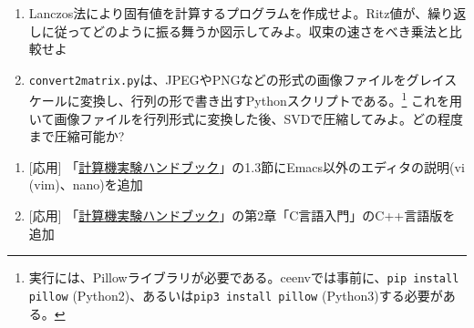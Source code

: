 \documentclass[11pt]{jarticle}
\begin{document}
\begin{enumerate}
\item Lanczos法により固有値を計算するプログラムを作成せよ。Ritz値が、繰り返しに従ってどのように振る舞うか図示してみよ。収束の速さをべき乗法と比較せよ

\item {\tt convert2matrix.py}は、JPEGやPNGなどの形式の画像ファイルをグレイスケールに変換し、行列の形で書き出すPythonスクリプトである。\footnote{実行には、Pillowライブラリが必要である。ceenvでは事前に、{\tt pip install pillow} (Python2)、あるいは{\tt pip3 install pillow} (Python3)する必要がある。} これを用いて画像ファイルを行列形式に変換した後、SVDで圧縮してみよ。どの程度まで圧縮可能か?

\end{enumerate}

\noindent {\bf [その他]}
\begin{enumerate}
\renewcommand{\labelenumi}{5-\arabic{enumi})}

\item \mbox{} [応用] 「\href{https://github.com/utphys-comp/handbook/releases/download/handbook-2019/handbook.pdf}{計算機実験ハンドブック}」の1.3節にEmacs以外のエディタの説明(vi (vim)、nano)を追加

\item \mbox{} [応用] 「\href{https://github.com/utphys-comp/handbook/releases/download/handbook-2021/handbook.pdf}{計算機実験ハンドブック}」の第2章「C言語入門」のC++言語版を追加

\end{enumerate}  
\end{document}
